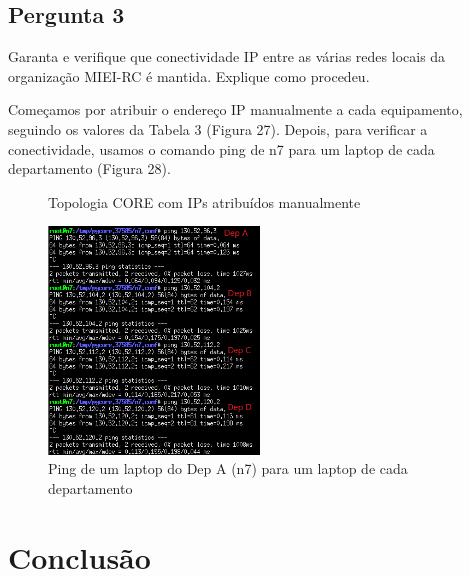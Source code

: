 \documentclass[11pt]{article}
\begin{document}
\clearpage
\subsection{Pergunta 3}

Garanta e verifique que conectividade IP entre as várias redes locais da organização MIEI-RC é mantida. Explique como procedeu.

\vspace{0.5cm}

Começamos por atribuir o endereço IP manualmente a cada equipamento, seguindo os valores da Tabela 3 (Figura 27). Depois, para verificar a conectividade, usamos o comando ping de n7 para um laptop de cada departamento (Figura 28).

\begin{figure}[!htb]
    \centering
    \caption{Topologia CORE com IPs atribuídos manualmente}
\end{figure}

\begin{figure}[!htb]
    \centering
    \includegraphics[width=0.5\textwidth]{images/parte3/pings_final.png}
    \caption{Ping de um laptop do Dep A (n7) para um laptop de cada departamento}
\end{figure}

\clearpage
\section{Conclusão}
\end{document}
